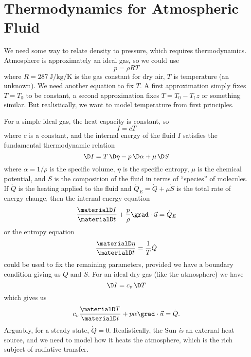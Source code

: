 \section{Thermodynamics for Atmospheric Fluid}
We need some way to relate density to pressure, which requires
thermodynamics. Atmosphere is approximately an ideal gas, so we could
use
\begin{equation}
  p = \rho R T
\end{equation}
where $R=\SI{287}{\joule\per\kilogram\per\kelvin}$ is the gas
constant for dry air, $T$ is temperature (an unknown). We need another
equation to fix $T$. A first approximation simply fixes $T=T_{0}$ to be
constant, a second approximation fixes $T=T_{0}-T_{1}z$ or something
similar. But realistically, we want to model temperature from first
principles.

For a simple ideal gas, the heat capacity is constant, so
\begin{equation}
  I = cT
\end{equation}
where $c$ is a constant, and the internal energy of the fluid $I$
satisfies the fundamental thermodynamic relation
\begin{equation}
  \D I = T\,\D\eta - p\,\D\alpha + \mu\,\D S
\end{equation}
where $\alpha=1/\rho$ is the specific volume, $\eta$ is the specific
entropy, $\mu$ is the chemical potential, and $S$ is the composition of
the fluid in terms of ``species'' of molecules. If $\dot{Q}$ is the
heating applied to the fluid and $\dot{Q}_{E} = \dot{Q} + \mu\dot{S}$ is
the total rate of energy change, then the internal energy equation
\begin{equation}
  \frac{\materialD I}{\materialD t} + \frac{p}{\rho}\grad\cdot\vec{u} = \dot{Q}_{E}
\end{equation}
or the entropy equation
\begin{equation}
\frac{\materialD \eta}{\materialD t} = \frac{1}{T}\dot{Q}
\end{equation}
could be used to fix the remaining parameters, provided we have a
boundary condition giving us $\dot{Q}$ and $\dot{S}$. For an ideal dry
gas (like the atmosphere) we have
\begin{equation}
  \D I = c_{v}\,\D T
\end{equation}
which gives us
\begin{equation}
c_{v}\frac{\materialD T}{\materialD t} + p\alpha\grad\cdot\vec{u} = \dot{Q}.
\end{equation}
Arguably, for a steady state, $\dot{Q}=0$. Realistically, the Sun
\emph{is} an external heat source, and we need to model how it heats the
atmosphere, which is the rich subject of radiative transfer.

